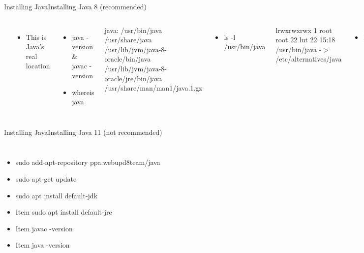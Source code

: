 \documentclass[aspectratio=1610,english]{beamer} %
\begin{document}
\begin{frame}{Installing Java}{Installing Java 8 (recommended)}
\begin{columns}
\begin{tabularx}{0.8\textwidth}{m{2em} m{15em} m{2em} m{7em}}
					\hline
				\end{tabularx}
				\begin{itemize}
					\small
					\item This is Java's real location
				\end{itemize}
				\begin{itemize}
					\small
					\color{black}
					\item java -version \& javac -version
					\item whereis java
				\end{itemize}
				\tiny
				java: /usr/bin/java /usr/share/java \\ 
				/usr/lib/jvm/java-8-oracle/bin/java \\ 
				/usr/lib/jvm/java-8-oracle/jre/bin/java \\
				/usr/share/man/man1/java.1.gz \\	

				\begin{itemize}
					\small
					\color{black}
					\item ls -l /usr/bin/java
				\end{itemize}
				\tiny
				lrwxrwxrwx 1 root root 22 lut 22 15:18 /usr/bin/java -$>$ /etc/alternatives/java
				
				\begin{itemize}
					\small
					\color{black}
					\item ls -l /etc/alternatives/java
				\end{itemize}
				\tiny
				lrwxrwxrwx 1 root root 46 lut 25 09:59 /etc/alternatives/java -$>$ /usr/lib/jvm/java-8-openjdk-amd64/jre/bin/java
				
				\begin{itemize}
					\small
					\color{black}
					\item ls -l /usr/lib/jvm/java-8-openjdk-amd64/jre/bin/java
				\end{itemize}
				\tiny
				-rwxr-xr-x 1 root root 6280 sty 14 22:02 /usr/lib/jvm/java-8-openjdk-amd64/jre/bin/java
		\end{columns}
	\end{frame}  	
  	\begin{frame}{Installing Java}{Installing Java 11 (not recommended)}
		\begin{columns}
				\begin{itemize}
					\small
					\color{red}
					\item sudo add-apt-repository ppa:webupd8team/java
					\item sudo apt-get update
					\item sudo apt install default-jdk
					\item Item sudo apt install default-jre
					\item Item javac -version
					\item Item java -version
				\end{itemize}
		\end{columns}
	\end{frame}  	
\end{document}

